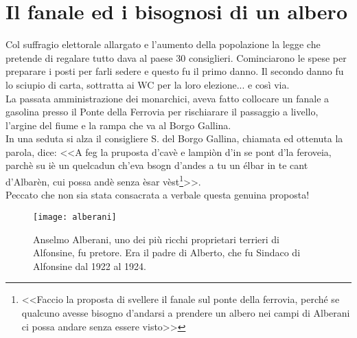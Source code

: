 
\chapter{Il fanale ed i bisognosi di un albero}
Col suffragio elettorale allargato e l'aumento della popolazione la legge che pretende di regalare tutto dava al paese 30 consiglieri. Cominciarono le spese per preparare i posti per farli sedere e questo fu il primo danno. Il secondo danno fu lo sciupio di carta, sottratta ai WC per la loro elezione... e così via.\\
\indent La passata amministrazione dei monarchici, aveva fatto collocare un fanale a gasolina presso il Ponte della Ferrovia per rischiarare il passaggio a livello, l'argine del fiume e la rampa che va al Borgo Gallina.\\
\indent In una seduta si alza il consigliere S.\: \: del Borgo Gallina, chiamata ed ottenuta la parola, dice: <<A feg la pruposta d'cavè e lampiòn d'in se pont d'la feroveia, parchè su iè un quelcadun ch'eva bsogn d'andes a tu un élbar in te cant d'Albarèn, cui possa andè senza èsar vèst\footnote{<<Faccio la proposta di svellere il fanale sul ponte della ferrovia, perché se qualcuno avesse bisogno d'andarsi a prendere un albero nei campi di Alberani ci possa andare senza essere visto>>}>>.\\
\indent Peccato che non sia stata consacrata a verbale questa genuina proposta!

 \begin{figure}[htb]
    \centering
    \texttt{[image: alberani]}
    \caption*{Anselmo Alberani, uno dei più ricchi proprietari terrieri di Alfonsine, fu pretore. Era il padre di Alberto, che fu Sindaco di Alfonsine dal 1922 al 1924.\label{fig:alberani}}
\end{figure}